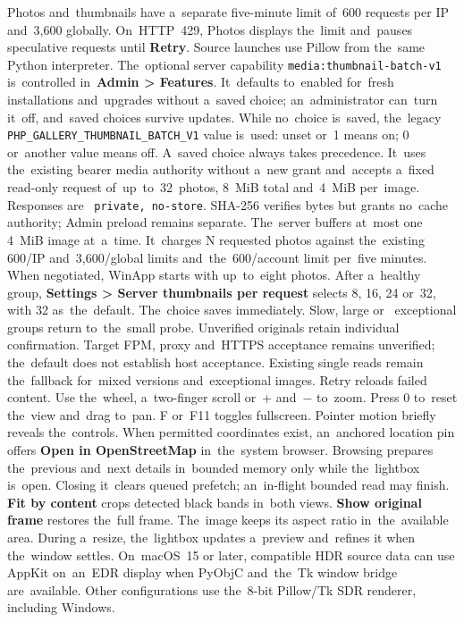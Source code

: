 \documentclass[11pt,a4paper]{article}
\newcommand{\ui}[1]{\textbf{#1}}
\newcommand{\codeword}[1]{\nolinkurl{#1}}
\begin{document}
Photos and~thumbnails have a~separate
five-minute limit of~600 requests per IP and~3,600 globally. On~HTTP~429,
Photos displays the~limit and~pauses speculative requests until \ui{Retry}. Source launches use Pillow
from the~same Python interpreter.
The~optional server capability \texttt{media:thumbnail-batch-v1} is~controlled
in~\ui{Admin > Features}. It~defaults to~enabled for~fresh installations and~upgrades
without a~saved choice; an~administrator can~turn it~off, and~saved choices
survive updates. While no~choice is~saved, the~legacy
\codeword{PHP_GALLERY_THUMBNAIL_BATCH_V1} value is~used: unset or~1 means on;
0 or~another value means off. A~saved choice always takes precedence. It~uses
the~existing bearer media authority without a~new grant and~accepts a~fixed
read-only request of~up~to~32~photos, 8~MiB total and~4~MiB per~image. Responses are~
\texttt{private, no-store}. SHA-256 verifies bytes but grants no~cache
authority; Admin preload remains separate. The~server buffers at~most one
4~MiB image at~a~time. It~charges N requested photos against the~existing
600/IP and~3,600/global limits and~the~600/account limit per~five minutes.
When negotiated, WinApp starts with up~to~eight photos. After a~healthy
group, \ui{Settings > Server thumbnails per request} selects 8, 16, 24 or~32,
with 32 as~the~default. The~choice saves immediately. Slow, large or~
exceptional groups return to~the~small probe.
Unverified originals retain individual confirmation. Target FPM, proxy and~HTTPS
acceptance remains unverified; the~default does not establish host acceptance.
Existing single reads remain the~fallback for~mixed versions and~exceptional
images.
Retry reloads failed content. Use the~wheel, a~two-finger scroll or~+ and~\ensuremath{-}
to~zoom. Press 0 to~reset the~view and~drag to~pan. F or~F11 toggles
fullscreen. Pointer motion briefly reveals the~controls. When permitted coordinates exist, an~anchored
location pin offers \ui{Open in OpenStreetMap} in~the~system browser. Browsing
prepares the~previous and~next details in~bounded memory only while the~lightbox
is~open. Closing it~clears queued prefetch; an~in-flight bounded read may finish.
\ui{Fit by content} crops
detected black bands in~both views. \ui{Show original frame} restores the~full
frame. The~image keeps its aspect ratio in~the~available area. During a~resize,
the~lightbox updates a~preview and~refines it when the~window settles.
On~macOS~15 or later, compatible HDR source data can use AppKit on~an~EDR
display when PyObjC and~the~Tk window bridge are~available. Other configurations
use the~8-bit Pillow/Tk SDR renderer, including Windows.
\end{document}
